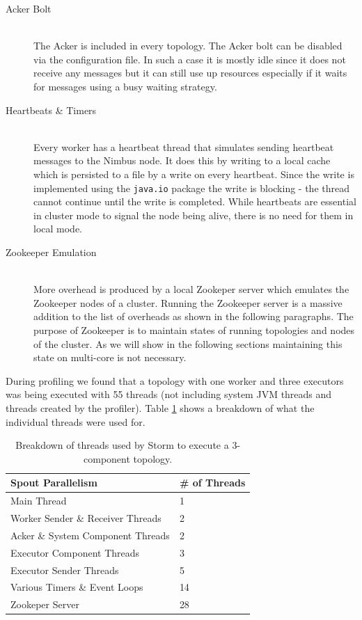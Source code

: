 \begin{description}
	\item[Acker Bolt] \hfill \\
	The Acker is included in every topology. The Acker bolt can be disabled via the configuration file. In such a case it is mostly idle since it does not receive any messages but it can still use up resources especially if it waits for messages using a busy waiting strategy.
	\item[Heartbeats \& Timers] \hfill \\
	Every worker has a heartbeat thread that simulates sending heartbeat messages to the Nimbus node. It does this by writing to a local cache which is persisted to a file by a write on every heartbeat. Since the write is implemented using the \texttt{java.io} package the write is blocking - the thread cannot continue until the write is completed. While heartbeats are essential in cluster mode to signal the node being alive, there is no need for them in local mode.
	\item[Zookeeper Emulation] \hfill \\
	More overhead is produced by a local Zookeper server which emulates the Zookeeper nodes of a cluster. Running the Zookeeper server is a massive addition to the list of overheads as shown in the following paragraphs. The purpose of Zookeeper is to maintain states of running topologies and nodes of the cluster. As we will show in the following sections maintaining this state on multi-core is not necessary.
\end{description}

During profiling we found that a topology with one worker and three executors was being executed with 55 threads (not including system JVM threads and threads created by the profiler). Table \ref{table:breakdown} shows a breakdown of what the individual threads were used for.

\begin{table}[htb!]
\centering
\small
\begin{tabular}{@{}ll@{}}
    \textbf{Spout Parallelism} & \textbf{\# of Threads} \\ \toprule
    Main Thread & 1  \\
	Worker Sender \& Receiver Threads & 2  \\
    Acker \& System Component Threads & 2  \\
    Executor Component Threads & 3  \\
    Executor Sender Threads & 5  \\
    Various Timers \& Event Loops & 14  \\
    Zookeper Server & 28  \\
\end{tabular}
\caption{Breakdown of threads used by Storm to execute a 3-component topology.}
\label{table:breakdown}
\end{table}

